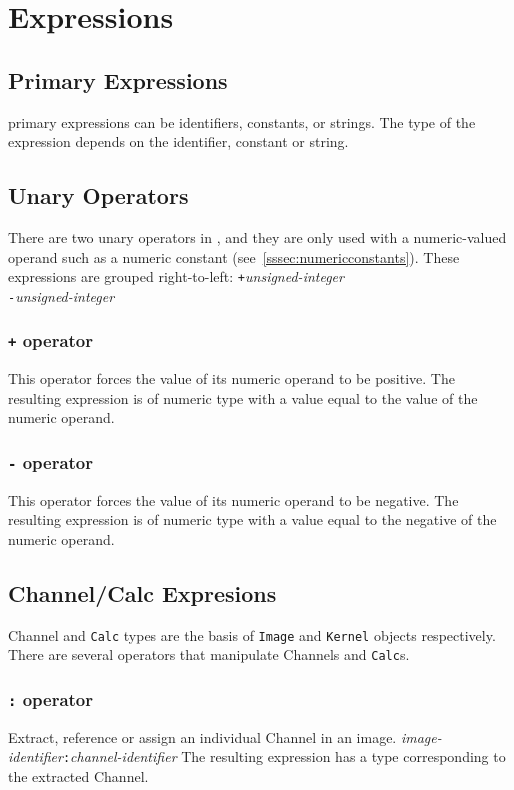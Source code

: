\section{Expressions}
\label{sec:expressions}

\subsection{Primary Expressions}
\label{ssec:primaryexpresions}
\sys{} primary expressions can be identifiers, constants, or strings.
The type of the expression depends on the identifier, constant or string.

\subsection{Unary Operators}
\label{ssec:unaryoperators}
There are two unary operators in \sys{}, and they are only used with a
numeric-valued operand such as a numeric constant
(see~\ref{sssec:numericconstants}).
These expressions are grouped right-to-left:
\startsyn
\texttt{+}\emph{unsigned-integer} \\
\texttt{-}\emph{unsigned-integer}
\stopsyn

\subsubsection{\texttt{+} operator}
This operator forces the value of its numeric operand to be positive.
The resulting expression is of numeric type with a value equal to the
value of the numeric operand.

\subsubsection{\texttt{-} operator}
This operator forces the value of its numeric operand to be negative.
The resulting expression is of numeric type with a value equal to the
negative of the numeric operand.

\subsection{Channel/Calc Expresions}
\label{ssec:channelexpressions}
Channel and \texttt{Calc} types are the basis of \texttt{Image} and
\texttt{Kernel} objects respectively. There are several operators that
manipulate Channels and \texttt{Calc}s.

\subsubsection{\texttt{:} operator}
\label{sssec:colonop}
Extract, reference or assign an individual Channel in an image.
\startsyn
\emph{image-identifier}\texttt{:}\emph{channel-identifier}
\stopsyn
The resulting expression has a type corresponding to the
extracted Channel.

